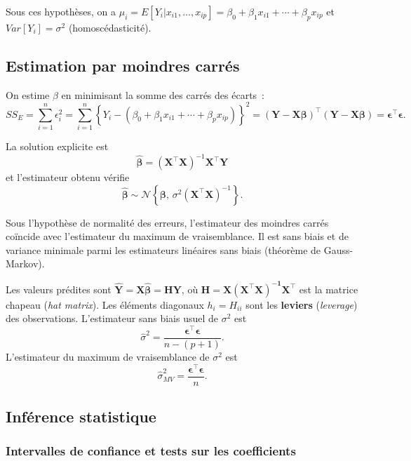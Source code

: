 \documentclass[11pt,letterpaper]{article}
\begin{document}
Sous ces hypothèses, on a $\mu_i =E[Y_i|x_{i1},\hdots, x_{ip}] =  \beta_0 + \beta_1 x_{i1} + \cdots + \beta_p x_{ip}$ et $Var[Y_i] = \sigma^2$ (homoscédasticité).



\subsection{Estimation par moindres carrés}

On estime $\beta$ en minimisant la somme des carrés des écarts~:
$$SS_E =\sum_{i=1}^n\epsilon_i^2= \sum_{i=1}^n \left\{Y_i - (\beta_0 + \beta_1 x_{i1} + \cdots + \beta_p x_{ip})\right\}^2 = (\boldsymbol{Y}-\boldsymbol{X\beta})^\top(\boldsymbol{Y}-\boldsymbol{X\beta})=\boldsymbol{\epsilon}^\top\boldsymbol{\epsilon}.$$

La solution explicite est
$$\boxed{\hat{\boldsymbol{\beta}} = (\boldsymbol{X}^\top \boldsymbol{X})^{-1} \boldsymbol{X}^\top \boldsymbol{Y}}$$
et l'estimateur obtenu vérifie
$$\hat{\boldsymbol{\beta}} \sim \mathcal{N}\left\{\boldsymbol{\beta},\, \sigma^2 (\boldsymbol{X}^\top \boldsymbol{X})^{-1}\right\}.$$

Sous l'hypothèse de normalité des erreurs, l'estimateur des moindres carrés coïncide avec l'estimateur du maximum de vraisemblance. Il est sans biais et de variance minimale parmi les estimateurs linéaires sans biais (théorème de Gauss-Markov).

Les valeurs prédites sont $\hat{\boldsymbol{Y}} = \boldsymbol{X\hat{\beta}} = \boldsymbol{HY}$, où $\boldsymbol{H} = \boldsymbol{X(X^\top X)^{-1}X^\top}$ est la matrice chapeau (\textit{hat matrix}). Les éléments diagonaux $h_i = H_{ii}$ sont les \textbf{leviers} (\textit{leverage}) des observations. L'estimateur sans biais usuel de $\sigma^2$ est
$$\hat\sigma^2 = \frac{\boldsymbol{\epsilon}^\top\boldsymbol{\epsilon}}{n-(p+1)}.$$
L'estimateur du maximum de vraisemblance de $\sigma^2$ est $$\hat\sigma^2_{MV} = \frac{\boldsymbol{\epsilon}^\top\boldsymbol{\epsilon}}{n}.$$

\subsection{Inférence statistique}

\subsubsection{Intervalles de confiance et tests sur les coefficients}
\end{document}

